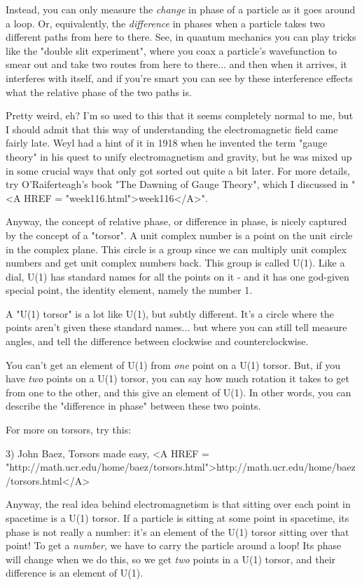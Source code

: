 Instead, you can only measure the \emph{change} in phase of a particle as
it goes around a loop.  Or, equivalently, the \emph{difference} in phases
when a particle takes two different paths from here to there.  See, 
in quantum mechanics you can play tricks like the "double slit 
experiment",
where you coax a particle's wavefunction to smear out and take two routes 
from here to there... and then when it arrives, it interferes with itself, 
and if you're smart you can see by these interference effects what the 
relative phase of the two paths is.

Pretty weird, eh?  I'm so used to this that it seems completely normal
to me, but I should admit that this way of understanding the
electromagnetic field came fairly late.  Weyl had a hint of it in 1918
when he invented the term "gauge theory" in his quest to
unify electromagnetism and gravity, but he was mixed up in some
crucial ways that only got sorted out quite a bit later.  For more
details, try O'Raiferteagh's book "The Dawning of Gauge
Theory", which I discussed in "<A HREF =
"week116.html">week116</A>".

Anyway, the concept of relative phase, or difference in phase, is
nicely captured by the concept of a "torsor".  A unit
complex number is a point on the unit circle in the complex plane.
This circle is a group since we can multiply unit complex numbers and
get unit complex numbers back.  This group is called U(1).  Like a
dial, U(1) has standard names for all the points on it - and it has
one god-given special point, the identity element, namely the number
1.

A "U(1) torsor" is a lot like U(1), but subtly different.
It's a circle where the points aren't given these standard
names... but where you can still tell measure angles, and tell the
difference between clockwise and counterclockwise.

You can't get an element of U(1) from \emph{one} point on a U(1)
torsor.  But, if you have \emph{two} points on a U(1) torsor, you
can say how much rotation it takes to get from one to the other, and
this give an element of U(1).  In other words, you can describe the
"difference in phase" between these two points.

For more on torsors, try this:

3) John Baez, Torsors made easy, <A HREF = "http://math.ucr.edu/home/baez/torsors.html">http://math.ucr.edu/home/baez/torsors.html</A>

Anyway, the real idea behind electromagnetism is that sitting over
each point in spacetime is a U(1) torsor.  If a particle is sitting at
some point in spacetime, its phase is not really a number: it's an
element of the U(1) torsor sitting over that point!  To get a
\emph{number}, we have to carry the particle around a loop!  Its
phase will change when we do this, so we get \emph{two} points in a
U(1) torsor, and their difference is an element of U(1).

